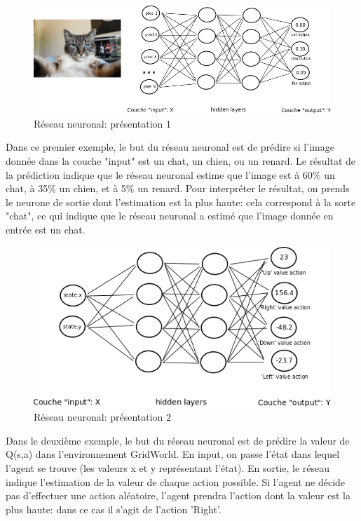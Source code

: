 \documentclass[11pt,a4paper]{report}
\begin{document}
    \begin{figure}[!h]
    \center
    \includegraphics[scale=0.56]{ressources/nn_presentation_1.png}
    \caption{Réseau neuronal: présentation 1}
    \end{figure} 
    
    \par Dans ce premier exemple, le but du réseau neuronal est de prédire si l'image donnée dans la couche "input" est un chat, un chien, ou un renard. Le résultat de la prédiction indique que le réseau neuronal estime que l'image est à 60\% un chat, à 35\% un chien, et à 5\% un renard. Pour interpréter le résultat, on prends le neurone de sortie dont l'estimation est la plus haute: cela correspond à la sorte "chat", ce qui indique que le réseau neuronal a estimé que l'image donnée en entrée est un chat. 
    
    \begin{figure}[!h]
    \center
    \includegraphics[scale=0.68]{ressources/nn_presentation_2.png}
    \caption{Réseau neuronal: présentation 2}
    \end{figure} 
    
    \par Dans le deuxième exemple, le but du réseau neuronal est de prédire la valeur de Q(s,a) dans l'environnement GridWorld. En input, on passe l'état dans lequel l'agent se trouve (les valeurs x et y représentant l'état). En sortie, le réseau indique l'estimation de la valeur de chaque action possible. Si l'agent ne décide pas d'effectuer une action aléatoire, l'agent prendra l'action dont la valeur est la plus haute: dans ce cas il s'agit de l'action 'Right'. 
    
\end{document}
